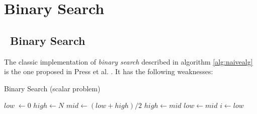 \documentclass[preprint,1p,times]{elsarticle}
\begin{document}
\section{Binary Search}

\subsection{\ClassicName\ Binary Search}
\label{sec:binary}

The classic implementation of \textit{binary search} described in algorithm \ref{alg:naivealg} is the one proposed in Press et al. \cite{NRC++}. It has the following weaknesses: 

\begin{algorithm}
\caption{{\ClassicName}  Binary Search (scalar problem)}
\label{alg:naivealg}
\begin{algorithmic}
\State $low\; \leftarrow 0$
\State $high  \leftarrow N$
 
    \State $mid \leftarrow (low+high) / 2$
      
        \State $high \leftarrow mid$
    \Else
        \State $low \leftarrow mid$
    \EndIf
\EndWhile
\State $i \leftarrow low$
\EndFunction
\end{algorithmic}
\end{algorithm}
\end{document}
